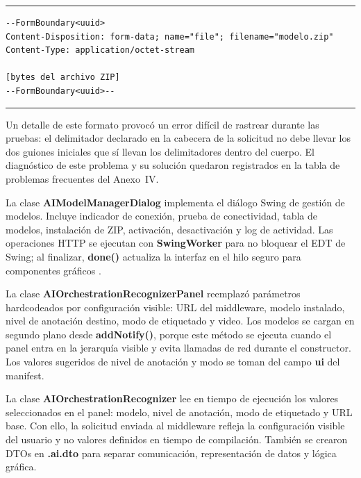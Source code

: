 \documentclass[11pt,a4paper]{article}
\begin{document}
\begin{center}
\begin{minipage}{0.82\textwidth}
\hrule
\vspace{0.12cm}
\small
\begin{Verbatim}[baselinestretch=0.82]
--FormBoundary<uuid>
Content-Disposition: form-data; name="file"; filename="modelo.zip"
Content-Type: application/octet-stream

[bytes del archivo ZIP]
--FormBoundary<uuid>--
\end{Verbatim}
\vspace{0.05cm}
\hrule

\label{lst:multipart_install_model}
\end{minipage}
\end{center}

Un detalle de este formato provocó un error difícil de rastrear durante las pruebas: el delimitador declarado en la cabecera de la solicitud no debe llevar los dos guiones iniciales que sí llevan los delimitadores dentro del cuerpo. El diagnóstico de este problema y su solución quedaron registrados en la tabla de problemas frecuentes del Anexo~IV.

La clase \textbf{AIModel\allowbreak{}ManagerDialog} implementa el diálogo Swing de gestión de modelos. Incluye indicador de conexión, prueba de conectividad, tabla de modelos, instalación de ZIP, activación, desactivación y log de actividad. Las operaciones HTTP se ejecutan con \textbf{SwingWorker} para no bloquear el EDT de Swing; al finalizar, \textbf{done()} actualiza la interfaz en el hilo seguro para componentes gráficos \cite{java_swingworker}.

La clase \textbf{AIOrchestration\allowbreak{}RecognizerPanel} reemplazó parámetros hardcodeados por configuración visible: URL del middleware, modelo instalado, nivel de anotación destino, modo de etiquetado y video. Los modelos se cargan en segundo plano desde \textbf{addNotify()}, porque este método se ejecuta cuando el panel entra en la jerarquía visible y evita llamadas de red durante el constructor. Los valores sugeridos de nivel de anotación y modo se toman del campo \textbf{ui} del manifest.

La clase \textbf{AIOrchestration\allowbreak{}Recognizer} lee en tiempo de ejecución los valores seleccionados en el panel: modelo, nivel de anotación, modo de etiquetado y URL base. Con ello, la solicitud enviada al middleware refleja la configuración visible del usuario y no valores definidos en tiempo de compilación. También se crearon DTOs en \textbf{.ai.dto} para separar comunicación, representación de datos y lógica gráfica.
\end{document}
